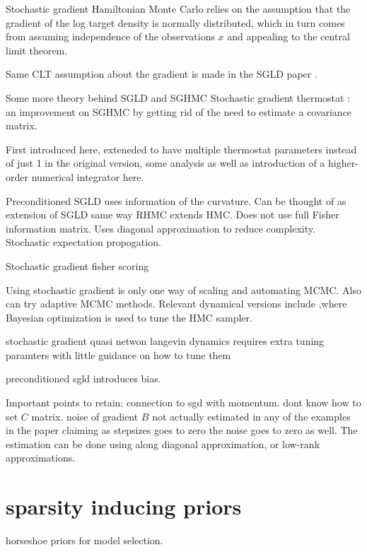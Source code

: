 \documentclass[]{report}
\begin{document}
Stochastic gradient Hamiltonian Monte Carlo \cite{chen2014stochastic}
relies on the assumption that the gradient of the log target density is normally distributed, which in turn comes from assuming independence of the observations $x$ and appealing to the central limit theorem.

Same CLT assumption about the gradient is made in
the SGLD paper \cite{welling2011bayesian}.

Some more theory behind SGLD and SGHMC \cite{ma2015complete}
Stochastic gradient thermostat : an improvement on SGHMC by getting rid of the need to estimate a covariance matrix. 

First introduced here\cite{ding2014bayesian}, exteneded\cite{gan2015scalable} to have multiple thermostat parameters instead of just 1 in the original version, some analysis as well as introduction of a higher-order numerical integrator here\cite{li2015high,chen2015convergence}.

Preconditioned SGLD \cite{li2015preconditioned} uses information of the curvature. Can be thought of as extension of SGLD same way RHMC extends HMC. Does not use full Fisher information matrix. Uses diagonal approximation to reduce complexity.
Stochastic expectation propogation.

Stochastic gradient fisher scoring \cite{ahn2012bayesian}

Using stochastic gradient is only one way of scaling and automating MCMC. Also can try adaptive MCMC methods\cite{roberts2009examples}. Relevant dynamical versions include \cite{wang2013adaptive},where Bayesian optimization \cite{mahendran2012adaptive,snoek2012practicalx,} is used to tune the HMC sampler.

stochastic gradient quasi netwon langevin dynamics requires extra tuning paramters with little guidance on how to tune them \cite{csimcsekli2016stochastic}

preconditioned sgld introduces bias\cite{li2015preconditioned}.


Important points to retain: connection to sgd with momentum. dont know how to
set $C$ matrix. noise of gradient $B$ not actually estimated in any of the
examples in the paper claiming as stepsizes goes to zero the noise goes to zero
as well. The estimation can be done using along diagonal approximation, or  
low-rank approximations. 

\section{sparsity inducing priors}
horseshoe priors for model selection.
\end{document}
